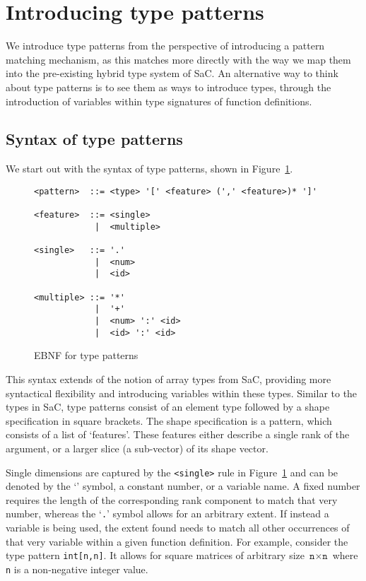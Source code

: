 \section{Introducing type patterns}

We introduce type patterns from the perspective of introducing a pattern matching mechanism, as this matches more directly with the way we map them into the pre-existing hybrid type system of SaC.
An alternative way to think about type patterns is to see them as ways to introduce types, through the introduction of variables within type signatures of function definitions.

\subsection{Syntax of type patterns}

We start out with the syntax of type patterns, shown in Figure~\ref{fig:syntax}.

\begin{figure}[hbt]
\begin{verbatim}
<pattern>  ::= <type> '[' <feature> (',' <feature>)* ']'

<feature>  ::= <single>
            |  <multiple>

<single>   ::= '.'
            |  <num>
            |  <id>

<multiple> ::= '*'
            |  '+'
            |  <num> ':' <id>
            |  <id> ':' <id>
\end{verbatim}
\caption{EBNF for type patterns}
\label{fig:syntax}
\end{figure}

\noindent
This syntax extends of the notion of array types from SaC, providing more syntactical flexibility and introducing variables within these types.
Similar to the types in SaC, type patterns consist of an element type followed by a shape specification in square brackets.
The shape specification is a pattern, which consists of a list of `features'.
These features either describe a single rank of the argument, or a larger slice (a sub-vector) of its shape vector.

Single dimensions are captured by the \verb|<single>| rule in Figure~\ref{fig:syntax} and can be denoted by the `\tpdot{}' symbol, a constant number, or a variable name.
A fixed number requires the length of the corresponding rank component to match that very number, whereas the `\texttt{.}' symbol allows for an arbitrary extent.
If instead a variable is being used, the extent found needs to match all other occurrences of that very variable within a given function definition.
For example, consider the type pattern \texttt{int[n,n]}.
It allows for square matrices of arbitrary size $\texttt{n} \times \texttt{n}$ where \texttt{n} is a non-negative integer value.

